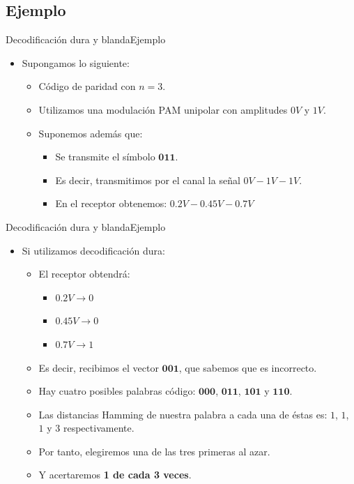 \documentclass[10pt,compress]{beamer} %
\begin{document}
\subsection{Ejemplo}
\begin{frame}{Decodificación dura y blanda}{Ejemplo}
  \begin{itemize}
    \item Supongamos lo siguiente: 
    \begin{itemize}
      \item Código de paridad con $n=3$.
      \item Utilizamos una modulación PAM unipolar con amplitudes $0V$ y $1V$.
      \item Suponemos además que:
      \begin{itemize}
        \item Se transmite el símbolo $\mathbf{011}$.
        \item Es decir, transmitimos por el canal la señal $0V - 1V - 1V$.
        \item En el receptor obtenemos: $0.2V - 0.45V - 0.7V$
      \end{itemize}
    \end{itemize}
  \end{itemize}
\end{frame}

\begin{frame}{Decodificación dura y blanda}{Ejemplo}
  \begin{itemize}
    \item Si utilizamos decodificación dura: 
    \begin{itemize}
      \item El receptor obtendrá:
      \begin{itemize}
        \item $0.2V \rightarrow 0$
        \item $0.45V \rightarrow 0$
        \item $0.7V \rightarrow 1$
      \end{itemize}
      \item Es decir, recibimos el vector $\mathbf{001}$, que sabemos que es incorrecto.
      \item Hay cuatro posibles palabras código: $\mathbf{000}$, $\mathbf{011}$, $\mathbf{101}$ y $\mathbf{110}$.
      \item Las distancias Hamming de nuestra palabra a cada una de éstas es: $1$, $1$, $1$ y $3$ respectivamente.
      \item Por tanto, elegiremos una de las tres primeras al azar.
      \item Y acertaremos {\bf 1 de cada 3 veces}.
    \end{itemize}
  \end{itemize}
\end{frame}
\end{document}
